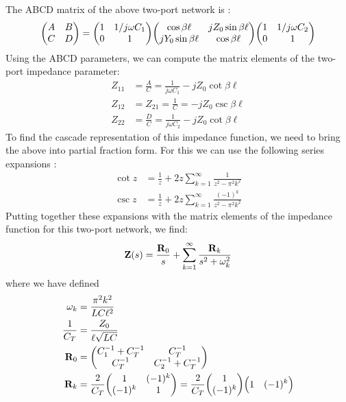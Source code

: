 The ABCD matrix of the above two-port network is \cite[Chapter 4]{Pozar_2011}:
\begin{equation}
    \mqty(A & B \\ C & D) = \mqty( 1 & 1/j\omega C_1 \\ 0 & 1) \mqty( \cos \beta\ell & jZ_0 \sin \beta\ell \\ jY_0\sin\beta\ell & \cos\beta\ell ) \mqty( 1 & 1/j\omega C_2 \\ 0 & 1)
\end{equation}
Using the ABCD parameters, we can compute the matrix elements of the two-port impedance parameter:
\begin{align}
    Z_{11} &= \frac{A}{C} = \frac{1}{j\omega C_1} - jZ_0 \cot\beta\ell \\
    Z_{12} &= Z_{21} = \frac{1}{C} = -jZ_0\csc\beta\ell \\ 
    Z_{22} &= \frac{D}{C} = \frac{1}{j\omega C_2} - jZ_0\cot\beta\ell
\end{align}
To find the cascade representation of this impedance function, we need to bring the above into partial fraction form. For this we can use the following series expansions \cite[1.421.3 and 1.422.3]{int_series_table}: 
\begin{align}
    \cot z &= \frac{1}{z} + 2z\sum_{k=1}^{\infty} \frac{1}{z^2 - \pi^2k^2} \\
    \csc z &= \frac{1}{z} + 2z\sum_{k=1}^{\infty} \frac{(-1)^{k}}{z^2 - \pi^2 k^2}
\end{align}
Putting together these expansions with the matrix elements of the impedance function for this two-port network, we find:
\begin{equation}
    \vb{Z}(s) = \frac{\vb{R}_0}{s} + \sum_{k=1}^{\infty} \frac{\vb{R}_k}{s^2 + \omega_k^2}
\end{equation}
where we have defined
\begin{align}
    \omega_k &= \frac{\pi^2 k^2}{L C \ell^2} \label{eq:ideal_TL_poles}\\
    \frac{1}{C_T} &= \frac{Z_0}{\ell\sqrt{L C}} \\
    \vb{R}_0 &= \mqty(C_1^{-1} + C_T^{-1} & C_T^{-1} \\ C_T^{-1} & C_2^{-1} + C_T^{-1}) \\
    \vb{R}_k &= \frac{2}{C_T} \mqty(1 & (-1)^k \\ (-1)^k & 1) = \frac{2}{C_T} \mqty(1 \\ (-1)^k) \Big(1 \quad (-1)^k\Big)
\end{align}

